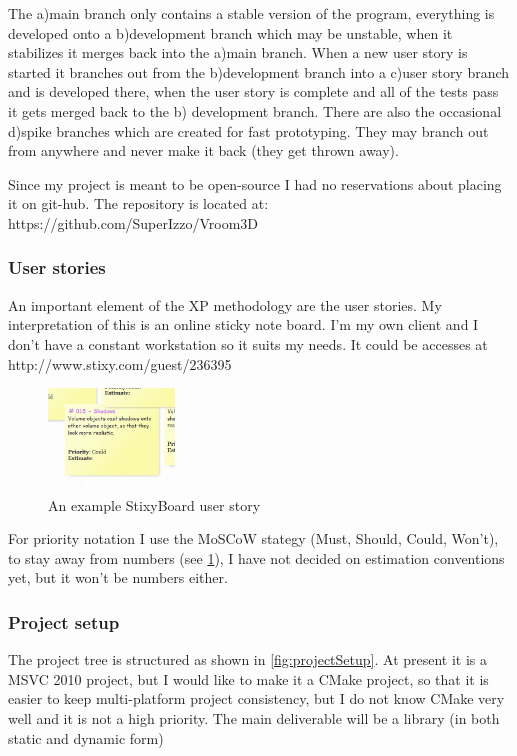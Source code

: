\documentclass[11pt,fleqn,twoside]{article}
\begin{document}
The a)main branch  only contains a stable version of the program, everything is developed onto a b)development branch which may be unstable, when it stabilizes it merges back into the a)main branch. When a new user story is started it branches out from the b)development branch into a c)user story branch and is developed there, when the user story is complete and all of the tests pass it gets merged back to the b) development branch. There are also the occasional d)spike branches which are created for fast prototyping. They may branch out from anywhere and never make it back (they get thrown away).

Since my project is meant to be open-source I had no reservations about placing it on git-hub. The repository is located at: https://github.com/SuperIzzo/Vroom3D

\subsubsection{User stories}
An important element of the XP methodology are the user stories. My interpretation of this is an online sticky note board. I'm my own client and I don't have a constant workstation so it suits my needs. It could be accesses at http://www.stixy.com/guest/236395

\begin{figure}[htb]
\centering
\includegraphics[width=0.3\textwidth]{user-story}
\caption{An example StixyBoard user story}
\label{fig:stixyUserStory}
\end{figure}

For priority notation I use the MoSCoW stategy\cite{AgileModUserStories} (Must, Should, Could, Won't), to stay away from numbers (see \ref{fig:stixyUserStory}), I have not decided on estimation conventions yet, but it won't be numbers either.

\FloatBarrier
\subsubsection{Project setup}
The project tree is structured as shown in \ref{fig:projectSetup}. At present it is a MSVC 2010 project, but I would like to make it a CMake project, so that it is easier to keep multi-platform project consistency, but I do not know CMake very well and it is not a high priority. The main deliverable will be a library (in both static and dynamic form)
\end{document}
